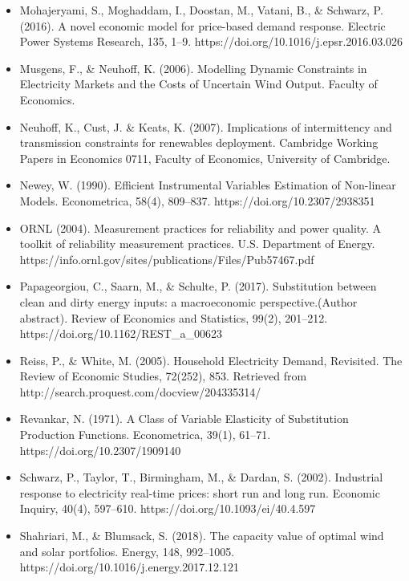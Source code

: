 \documentclass[aspectratio=169]{beamer}
\begin{document}
\begin{frame}[allowframebreaks]
\begin{itemize}
			\item Mohajeryami, S., Moghaddam, I., Doostan, M., Vatani, B., \& Schwarz, P. (2016). A novel economic model for price-based demand response. Electric Power Systems Research, 135, 1–9. https://doi.org/10.1016/j.epsr.2016.03.026
			
			\item Musgens, F., \& Neuhoff, K. (2006). Modelling Dynamic Constraints in Electricity Markets and the Costs of Uncertain Wind Output. Faculty of Economics.
			
			\item Neuhoff, K., Cust, J. \& Keats, K. (2007). Implications of intermittency and transmission constraints for renewables deployment. Cambridge Working Papers in Economics 0711, Faculty of Economics, University of Cambridge.
			
			\item Newey, W. (1990). Efficient Instrumental Variables Estimation of Non-linear Models. Econometrica, 58(4), 809–837. https://doi.org/10.2307/2938351
			
			\item ORNL (2004). Measurement practices for reliability and power quality. A toolkit of reliability measurement practices. U.S. Department of Energy. https://info.ornl.gov/sites/publications/Files/Pub57467.pdf
			
			\item Papageorgiou, C., Saarn, M., \& Schulte, P. (2017). Substitution between clean and dirty energy inputs: a macroeconomic perspective.(Author abstract). Review of Economics and Statistics, 99(2), 201–212. https://doi.org/10.1162/REST\_a\_00623
			
			\item Reiss, P., \& White, M. (2005). Household Electricity Demand, Revisited. The Review of Economic Studies, 72(252), 853. Retrieved from http://search.proquest.com/docview/204335314/
			
			\item Revankar, N. (1971). A Class of Variable Elasticity of Substitution Production Functions. Econometrica, 39(1), 61–71. https://doi.org/10.2307/1909140
			
			\item Schwarz, P., Taylor, T., Birmingham, M., \& Dardan, S. (2002). Industrial response to electricity real-time prices: short run and long run. Economic Inquiry, 40(4), 597–610. https://doi.org/10.1093/ei/40.4.597
			
			\item Shahriari, M., \& Blumsack, S. (2018). The capacity value of optimal wind and solar portfolios. Energy, 148, 992–1005. https://doi.org/10.1016/j.energy.2017.12.121
			

\end{itemize}
\end{frame}
\end{document}
